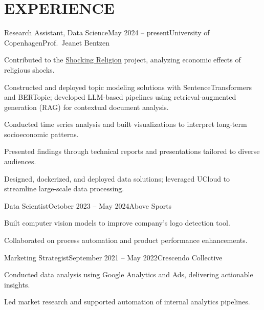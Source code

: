 \documentclass{resume}
\begin{document}
\section{EXPERIENCE}
\begin{content}

    \begin{position}{Research Assistant, Data Science}{May 2024 -- present}{University of Copenhagen}{Prof.~Jeanet Bentzen}{}
    \item Contributed to the {\href{https://www.economics.ku.dk/research/externally-funded-research_new/shocking-religion/}{Shocking Religion}} project, analyzing economic effects of religious shocks.
    \item Constructed and deployed topic modeling solutions with SentenceTransformers and BERTopic; developed LLM-based pipelines using retrieval-augmented generation (RAG) for contextual document analysis.
    \item Conducted time series analysis and built visualizations to interpret long-term socioeconomic patterns.
    \item Presented findings through technical reports and presentations tailored to diverse audiences.
    \item Designed, dockerized, and deployed data solutions; leveraged UCloud to streamline large-scale data processing.
    \end{position}

    \begin{position}{Data Scientist}{October 2023 -- May 2024}{Above Sports}{}{}
    \item Built computer vision models to improve company’s logo detection tool.
    \item Collaborated on process automation and product performance enhancements.
    \end{position}

    \begin{position}{Marketing Strategist}{September 2021 -- May 2022}{Crescendo Collective}{}{}
    \item Conducted data analysis using Google Analytics and Ads, delivering actionable insights.
    \item Led market research and supported automation of internal analytics pipelines.
    \end{position}

\sectionlineskip
\end{content}

\end{document}
